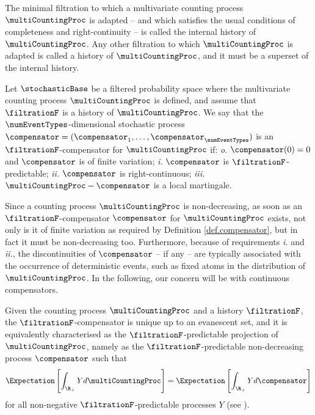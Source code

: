 The minimal filtration to which a multivariate counting process $\multiCountingProc$ is adapted
-- and which satisfies the usual conditions of completeness and right-continuity --
is called the internal history of $\multiCountingProc$.
Any other filtration to which $\multiCountingProc$ is adapted is called a history of
$\multiCountingProc$, and it must be a superset of the internal history.

\begin{defi}\label{def.compensator}
 Let $\stochasticBase$ be a filtered probability space where the multivariate counting process
 $\multiCountingProc$ is defined,
 and assume that $\filtrationF$ is a history of $\multiCountingProc$.
 We say that the $\numEventTypes$-dimensional stochastic process
 $\compensator = (\compensator_1, \dots , \compensator_{\numEventTypes})$
 is an $\filtrationF$-compensator for $\multiCountingProc$ if:
 \emph{o.} $\compensator(0)=0$ and $\compensator$ is of finite variation;
 \emph{i.} $\compensator$ is $\filtrationF$-predictable;
 \emph{ii.} $\compensator$ is right-continuous;
 \emph{iii.} $\multiCountingProc - \compensator$ is a local martingale.
\end{defi}

Since a counting process $\multiCountingProc$ is non-decreasing,
as soon as an $\filtrationF$-compensator $\compensator$ for $\multiCountingProc$ exists,
not only is it of finite variation as required by Definition \ref{def.compensator},
but in fact it must be non-decreasing too.
Furthermore, because of requirements \emph{i.} and \emph{ii.},
the discontinuities of $\compensator$ -- if any --
are typically associated with the occurrence of deterministic events,
such as fixed atoms in the distribution of $\multiCountingProc$.
In the following, our concern will be with continuous compensators.

Given the counting process $\multiCountingProc$ and a history $\filtrationF$,
the $\filtrationF$-compensator is unique up to an evanescent set,
and it is equivalently characterised as the $\filtrationF$-predictable projection of
$\multiCountingProc$,
namely as the $\filtrationF$-predictable non-decreasing process $\compensator$ such that
\begin{equation}\label{eq.compensators_and_predict_projections}
 \Expectation \left[ \int_{\R_+} Y d\multiCountingProc\right]
 =
 \Expectation \left[ \int_{\R_+} Y d\compensator\right]
\end{equation}
for all non-negative $\filtrationF$-predictable processes $Y$
(see \cite[Proposition 14.2.II]{DVJ08int}).

